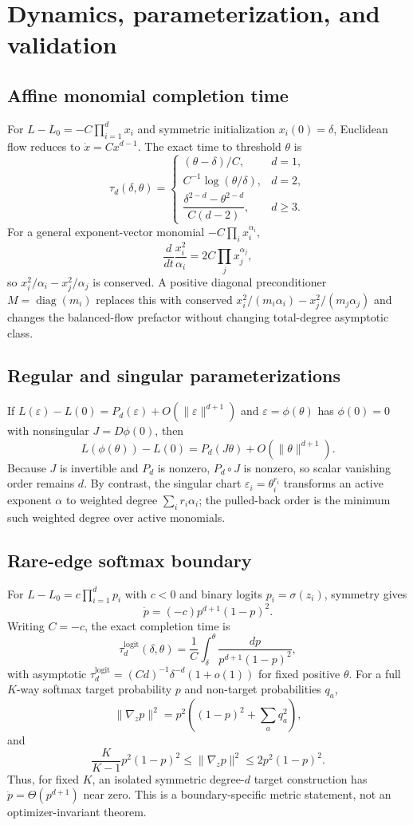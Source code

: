 \section{Dynamics, parameterization, and validation}
\label{app:dynamics}

\subsection{Affine monomial completion time}
For $L-L_0=-C\prod_{i=1}^d x_i$ and symmetric initialization $x_i(0)=\delta$, Euclidean flow reduces to $\dot x=Cx^{d-1}$. The exact time to threshold $\theta$ is
\[
\tau_d(\delta,\theta)=
\begin{cases}
(\theta-\delta)/C,&d=1,\\
C^{-1}\log(\theta/\delta),&d=2,\\
\dfrac{\delta^{2-d}-\theta^{2-d}}{C(d-2)},&d\geq3.
\end{cases}
\]
For a general exponent-vector monomial $-C\prod_i x_i^{\alpha_i}$,
\[
\frac{d}{dt}\frac{x_i^2}{\alpha_i}=2C\prod_jx_j^{\alpha_j},
\]
so $x_i^2/\alpha_i-x_j^2/\alpha_j$ is conserved. A positive diagonal preconditioner $M=\operatorname{diag}(m_i)$ replaces this with conserved $x_i^2/(m_i\alpha_i)-x_j^2/(m_j\alpha_j)$ and changes the balanced-flow prefactor without changing total-degree asymptotic class.

\subsection{Regular and singular parameterizations}
If $L(\varepsilon)-L(0)=P_d(\varepsilon)+O(\|\varepsilon\|^{d+1})$ and $\varepsilon=\phi(\theta)$ has $\phi(0)=0$ with nonsingular $J=D\phi(0)$, then
\[
L(\phi(\theta))-L(0)=P_d(J\theta)+O(\|\theta\|^{d+1}).
\]
Because $J$ is invertible and $P_d$ is nonzero, $P_d\circ J$ is nonzero, so scalar vanishing order remains $d$. By contrast, the singular chart $\varepsilon_i=\theta_i^{r_i}$ transforms an active exponent $\alpha$ to weighted degree $\sum_i r_i\alpha_i$; the pulled-back order is the minimum such weighted degree over active monomials.

\subsection{Rare-edge softmax boundary}
For $L-L_0=c\prod_{i=1}^dp_i$ with $c<0$ and binary logits $p_i=\sigma(z_i)$, symmetry gives
\[
\dot p=(-c)p^{d+1}(1-p)^2.
\]
Writing $C=-c$, the exact completion time is
\[
\tau_d^{\mathrm{logit}}(\delta,\theta)=\frac1C\int_\delta^\theta\frac{dp}{p^{d+1}(1-p)^2},
\]
with asymptotic $\tau_d^{\mathrm{logit}}=(Cd)^{-1}\delta^{-d}(1+o(1))$ for fixed positive $\theta$. For a full $K$-way softmax target probability $p$ and non-target probabilities $q_a$,
\[
\|\nabla_zp\|^2=p^2\left((1-p)^2+\sum_aq_a^2\right),
\]
and
\[
\frac{K}{K-1}p^2(1-p)^2\leq\|\nabla_zp\|^2\leq2p^2(1-p)^2.
\]
Thus, for fixed $K$, an isolated symmetric degree-$d$ target construction has $\dot p=\Theta(p^{d+1})$ near zero. This is a boundary-specific metric statement, not an optimizer-invariant theorem.

